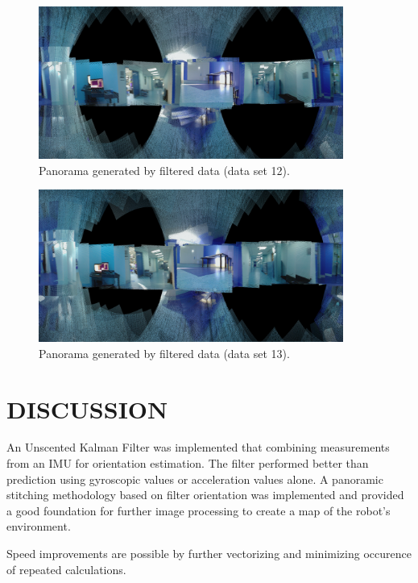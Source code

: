\documentclass[letterpaper, 10 pt, conference]{ieeeconf}  %
\begin{document}
\begin{figure} [ht]
  \includegraphics[width=\textwidth,height=5cm]{panorama12}
  \caption{Panorama generated by filtered data (data set 12).}
  \label{pano12}
\end{figure}

\begin{figure} [ht]
  \includegraphics[width=\textwidth,height=5cm]{panorama13}
  \caption{Panorama generated by filtered data (data set 13).}
  \label{pano13}
\end{figure} 

\section{DISCUSSION}
An Unscented Kalman Filter was implemented that combining measurements from an IMU for orientation estimation. The filter performed better than prediction using gyroscopic values or acceleration values alone. A panoramic stitching methodology based on filter orientation was implemented and provided a good foundation for further image processing to create a map of the robot's environment.

Speed improvements are possible by further vectorizing and minimizing occurence of repeated calculations.

\addtolength{\textheight}{-5cm}   %
\end{document}
